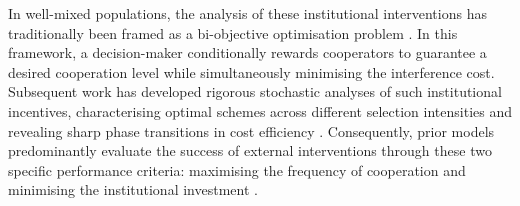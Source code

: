 \documentclass{article}
\begin{document}
In well-mixed populations, the analysis of these institutional interventions has traditionally been framed as a bi-objective optimisation problem \cite{han2018interference,duong2023cost}. In this framework, a decision-maker conditionally rewards cooperators to guarantee a desired cooperation level while simultaneously minimising the interference cost. Subsequent work has developed rigorous stochastic analyses of such institutional incentives, characterising optimal schemes across different selection intensities and revealing sharp phase transitions in cost efficiency \cite{duonghan2021cost,duong2026cost}. Consequently, prior models predominantly evaluate the success of external interventions through these two specific performance criteria: maximising the frequency of cooperation and minimising the institutional investment \cite{wang2019exploring,gross2025hidden}.
\end{document}
